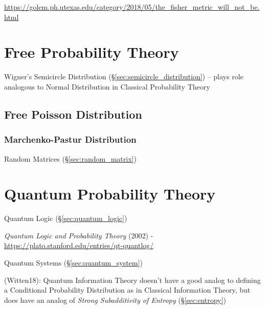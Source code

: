 \url{https://golem.ph.utexas.edu/category/2018/05/the_fisher_metric_will_not_be.html}



\section{Free Probability Theory}\label{sec:free_probability}

Wigner's Semicircle Distribution (\S\ref{sec:semicircle_distribution}) -- plays
role analogous to Normal Distribution in Classical Probability Theory



\subsection{Free Poisson Distribution}\label{sec:free_poisson}

\subsubsection{Marchenko-Pastur Distribution}\label{sec:marchenko_pastur}

Random Matrices (\S\ref{sec:random_matrix})



\section{Quantum Probability Theory}\label{sec:quantum_probability}

Quantum Logic (\S\ref{sec:quantum_logic})

\emph{Quantum Logic and Probability Theory} (2002) -
\url{https://plato.stanford.edu/entries/qt-quantlog/}

Quantum Systems (\S\ref{sec:quantum_system})

(Witten18): Quantum Information Theory doesn't have a good analog to defining a
Conditional Probability Distribution as in Classical Information Theory, but
does have an analog of \emph{Strong Subadditivity of Entropy}
(\S\ref{sec:entropy})

